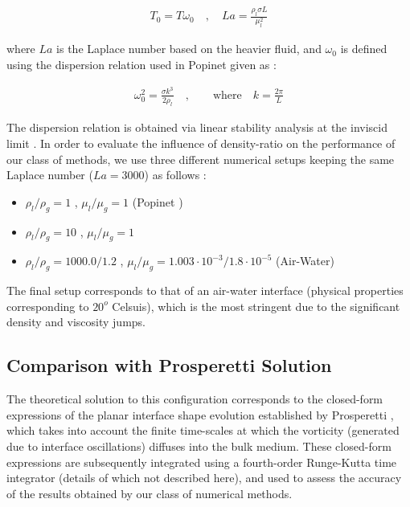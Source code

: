 \begin{align}
	T_0 = T \omega_0 \quad , \quad La = \frac{\rho_l \sigma L}{\mu_l^2}  
\end{align}

where $La$ is the Laplace number based on the heavier fluid, and $\omega_0$ is defined using the dispersion relation used in Popinet \cite{popinet2009accurate} given as : 

\begin{align}
	\omega_0^2 =  \frac{\sigma k^3}{2 \rho_l} \quad, \qquad \text{where} \quad k = \frac{2\pi}{L}   
\end{align}

The dispersion relation is obtained via linear stability analysis at the inviscid limit . In order to evaluate the influence of density-ratio on the performance of our class of methods, we use three different numerical setups keeping the same Laplace number ($La = 3000$) as follows : 

\begin{itemize}
	\item $\rho_l/\rho_g = 1$ , $\mu_l/\mu_g = 1$  (Popinet \cite{popinet2009accurate}) 
	\item $\rho_l/\rho_g = 10$ , $\mu_l/\mu_g = 1$   
	\item $\rho_l/\rho_g = 1000.0/1.2$ , $\mu_l/\mu_g = 1.003\cdot 10^{-3}/1.8\cdot 10^{-5}$ (Air-Water) 
\end{itemize}

The final setup corresponds to that of an air-water interface (physical properties corresponding to $20^o$ Celsuis), which is the most stringent due to the significant density and viscosity jumps. 

\subsection*{Comparison with Prosperetti Solution}

The theoretical solution to this configuration corresponds to the closed-form expressions of the planar interface shape evolution established by Prosperetti \cite{prosperetti1981motion,prosperetti1980free}, which takes into account the finite time-scales at which the vorticity (generated due to interface oscillations) diffuses into the bulk medium. These closed-form expressions are subsequently integrated using a fourth-order Runge-Kutta time integrator (details of which not described here), and used to assess the accuracy of the results obtained by our class of numerical methods. 


